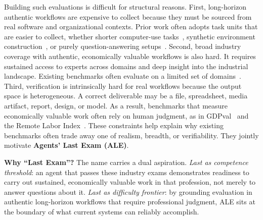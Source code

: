 \documentclass{llmxive}
\begin{document}
Building such evaluations is difficult for structural reasons. First, long-horizon authentic workflows are expensive to collect because they must be sourced from real software and organizational contexts. Prior work often adopts task units that are easier to collect, whether shorter computer-use tasks~\citep{xie2024osworld}, synthetic environment construction~\citep{aggarwal2026gymanything}, or purely question-answering setups~\citep{yang2026onemillionbench}. Second, broad industry coverage with authentic, economically valuable workflows is also hard. It requires sustained access to experts across domains and deep insight into the industrial landscape. Existing benchmarks often evaluate on a limited set of domains~\citep{alphaeval2026}. Third, verification is intrinsically hard for real workflows because the output space is heterogeneous. A correct deliverable may be a file, spreadsheet, media artifact, report, design, or model. As a result, benchmarks that measure economically valuable work often rely on human judgment, as in GDPval~\citep{patwardhan2025gdpval} and the Remote Labor Index~\citep{mazeika2025rli}. These constraints help explain why existing benchmarks often trade away one of realism, breadth, or verifiability. They jointly motivate \textbf{Agents' Last Exam (ALE)}.

\begin{lastexambox}
\textbf{Why ``Last Exam''?}\enspace
The name carries a dual aspiration.
\emph{Last as competence threshold}: an agent that passes these industry exams demonstrates readiness to carry out sustained, economically valuable work in that profession, not merely to answer questions about it.
\emph{Last as difficulty frontier}: by grounding evaluation in authentic long-horizon workflows that require professional judgment, ALE sits at the boundary of what current systems can reliably accomplish.
\end{lastexambox}
\end{document}
